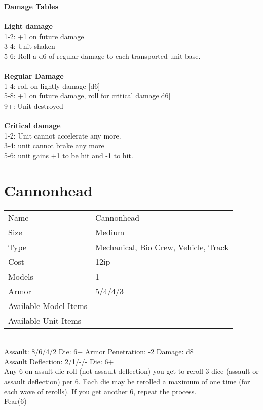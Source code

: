 {\bf Damage Tables} \\
\ \\ {\bf Light damage } \\
1-2: +1 on future damage \\
3-4: Unit shaken \\
5-6: Roll a d6 of regular damage to each transported unit base. \\
\ \\ {\bf Regular Damage } \\
1-4: roll on lightly damage [d6] \\
5-8: +1 on future damage, roll for critical damage[d6] \\
9+: Unit destroyed \\
\ \\ {\bf Critical damage } \\
1-2: Unit cannot accelerate any more.  \\
3-4: unit cannot brake any more \\
5-6: unit gains +1 to be hit and -1 to hit. \\









\pagebreak

\section{ Cannonhead }

\begin{tabular}{ll}
  Name & Cannonhead \\
  Size & Medium\\
  Type & Mechanical, Bio Crew, Vehicle, Track\\
  Cost & 12ip\\
  Models & 1\\
  Armor & 5/4/4/3\\
  Available Model Items &  \\
  Available Unit Items &  \\
\end{tabular}

\ \\
Assault: 8/6/4/2 Die: 6+ Armor Penetration: -2 Damage: d8 \\
Assault Deflection: 2/1/-/- Die: 6+\\
\indent Any 6 on assult die roll (not assault deflection) you get to reroll 3 dice (assault or assault deflection) per 6. Each die may be rerolled a maximum of one time (for each wave of rerolls). If you get another 6, repeat the process. \\ Fear(6) \\
\ \\

